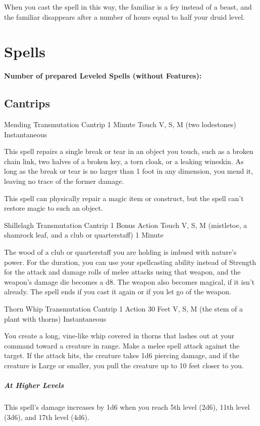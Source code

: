 \documentclass[letterpaper,openany,oneside,twocolumn]{book}
\begin{document}
When you cast the spell in this way, the familiar is a fey instead of a beast, and the familiar disappears after a number of hours equal to half your druid level.

\vfill\eject
\section*{Spells}
\textbf{Number of prepared Leveled Spells (without Features):} \intcalcAdd{\calculateModifier{\WisdomScoreValue}}{\intcalcShr{\LevelValue}}
\subsection*{Cantrips}

\DndSpellHeader
  {Mending}
  {Transmutation Cantrip}
  {1 Minute}
  {Touch}
  {V, S, M (two lodestones)}
  {Instantaneous}

This spell repairs a single break or tear in an object you touch, such as a broken chain link, two halves of a broken key, a torn cloak, or a leaking wineskin. As long as the break or tear is no larger than 1 foot in any dimension, you mend it, leaving no trace of the former damage.

This spell can physically repair a magic item or construct, but the spell can't restore magic to such an object.

\DndSpellHeader
  {Shillelagh}
  {Transmutation Cantrip}
  {1 Bonus Action}
  {Touch}
  {V, S, M (mistletoe, a shamrock leaf, and a club or quarterstaff)}
  {1 Minute}

The wood of a club or quarterstaff you are holding is imbued with nature's power. For the duration, you can use your spellcasting ability instead of Strength for the attack and damage rolls of melee attacks using that weapon, and the weapon's damage die becomes a d8. The weapon also becomes magical, if it isn't already. The spell ends if you cast it again or if you let go of the weapon.

\DndSpellHeader
  {Thorn Whip}
  {Transmutation Cantrip}
  {1 Action}
  {30 Feet}
  {V, S, M (the stem of a plant with thorns)}
  {Instantaneous}

You create a long, vine-like whip covered in thorns that lashes out at your command toward a creature in range. Make a melee spell attack against the target. If the attack hits, the creature takes 1d6 piercing damage, and if the creature is Large or smaller, you pull the creature up to 10 feet closer to you.

\subparagraph*{At Higher Levels} This spell's damage increases by 1d6 when you reach 5th level (2d6), 11th level (3d6), and 17th level (4d6).
\end{document}
